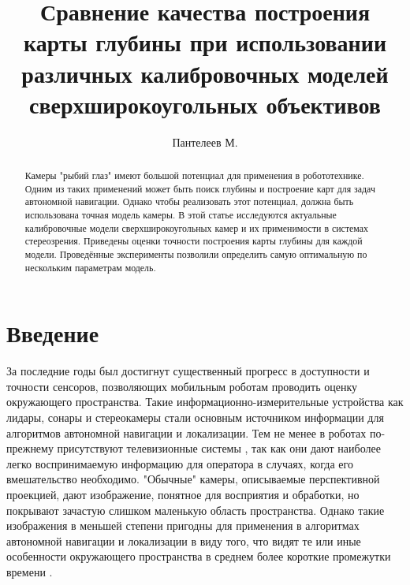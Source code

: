 

\raggedbottom
%


\title{Сравнение качества построения карты глубины при использовании различных калибровочных моделей сверхширокоугольных объективов}
\author{Пантелеев М.}
\maketitle

\begin{abstract}
	Камеры "рыбий глаз" имеют большой потенциал для применения в робототехнике. Одним из таких применений может быть поиск глубины и построение карт для задач автономной
	навигации. Однако чтобы реализовать этот потенциал, должна быть использована точная модель камеры. В этой статье исследуются актуальные калибровочные модели 
	сверхширокоугольных камер и их применимости в системах стереозрения. Приведены оценки точности построения карты глубины для каждой модели. Проведённые эксперименты 
	позволили определить самую оптимальную по нескольким параметрам модель. 

\end{abstract}

\section{Введение}

За последние годы был достигнут существенный прогресс в доступности и точности сенсоров, позволяющих мобильным роботам 
проводить оценку окружающего пространства. Такие информационно-измерительные устройства как лидары, сонары и стереокамеры
 стали основным источником информации для алгоритмов автономной навигации и локализации. Тем не менее в роботах по-прежнему 
присутствуют телевизионные системы \cite{mars_rover}, так как они дают наиболее легко воспринимаемую информацию для оператора в случаях, когда 
его вмешательство необходимо. "Обычные" камеры, описываемые перспективной проекцией, дают изображение, понятное для 
восприятия и обработки, но покрывают зачастую слишком маленькую область пространства. Однако такие изображения в меньшей степени 
пригодны для применения в алгоритмах автономной навигации и локализации в виду того, что видят те или иные особенности окружающего
пространства в среднем более короткие промежутки времени \cite{stereo_slam}. 

